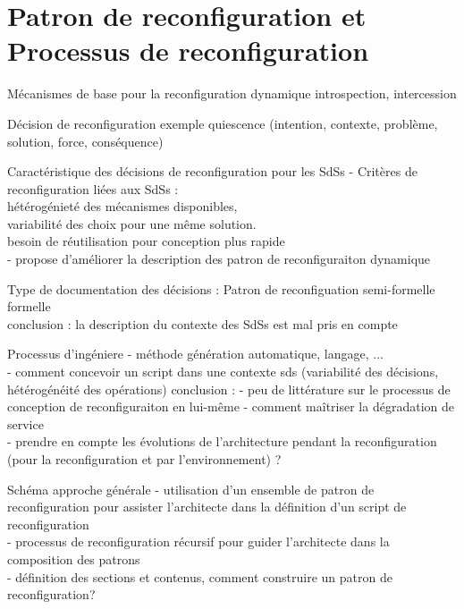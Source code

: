 \section{Patron de reconfiguration et Processus de reconfiguration}

\begin{frame}{Mécanismes de base pour la reconfiguration dynamique}
introspection, intercession
\end{frame}

\begin{frame}{Décision de reconfiguration}
    exemple quiescence (intention, contexte, problème, 
solution, force, conséquence)
\end{frame}

\begin{frame}{Caractéristique des décisions de reconfiguration pour les SdSs}
- Critères de reconfiguration liées aux  SdSs : \\
hétérogénieté des mécanismes disponibles, \\
variabilité des choix pour une même solution.\\
besoin de réutilisation pour conception plus rapide\\
- propose d'améliorer la description des patron de reconfiguraiton dynamique     
\end{frame}

\begin{frame}{Type de documentation des décisions : Patron de reconfiguation}
    semi-formelle\\
formelle\\
conclusion : la description du contexte des SdSs est mal pris en compte
\end{frame}

\begin{frame}{Processus d'ingéniere}
- méthode génération automatique, 
langage, ...\\
- comment concevoir un script dans une contexte sds
(variabilité des décisions, hétérogénéité des opérations)
conclusion : - peu de littérature sur le processus de conception de reconfiguraiton en lui-même
- comment maîtriser la dégradation de service \\
- prendre en compte les évolutions de l'architecture pendant la reconfiguration 
(pour la reconfiguration et par l'environnement) ?      
\end{frame}

\begin{frame}{Schéma approche générale}
- utilisation d'un ensemble de patron de reconfiguration pour assister l'architecte dans la définition d'un script de reconfiguration\\
- processus de reconfiguration récursif pour guider l'architecte dans la composition des patrons\\
- définition des sections et contenus, comment construire un patron de reconfiguration? 
\end{frame}

